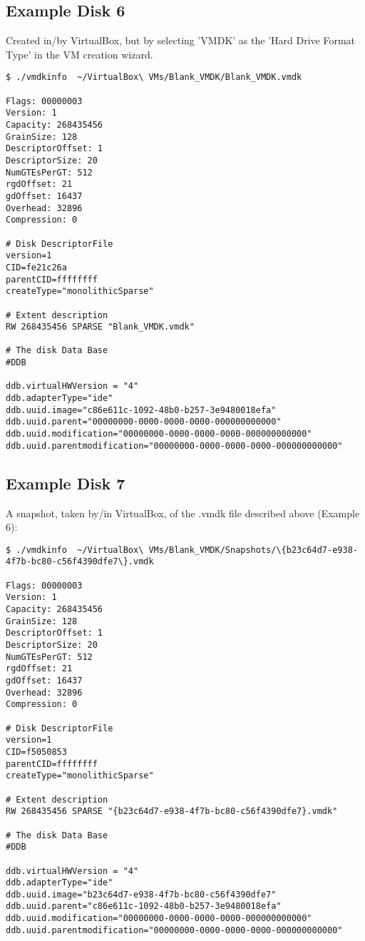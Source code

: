 \documentclass{article}
\begin{document}
\subsection{Example Disk 6}

Created in/by VirtualBox, but by selecting 'VMDK' as the 'Hard Drive
Format Type' in the VM creation wizard.

\begin{verbatim}
$ ./vmdkinfo  ~/VirtualBox\ VMs/Blank_VMDK/Blank_VMDK.vmdk 

Flags: 00000003
Version: 1
Capacity: 268435456
GrainSize: 128
DescriptorOffset: 1
DescriptorSize: 20
NumGTEsPerGT: 512
rgdOffset: 21
gdOffset: 16437
Overhead: 32896
Compression: 0

# Disk DescriptorFile
version=1
CID=fe21c26a
parentCID=ffffffff
createType="monolithicSparse"

# Extent description
RW 268435456 SPARSE "Blank_VMDK.vmdk"

# The disk Data Base 
#DDB

ddb.virtualHWVersion = "4"
ddb.adapterType="ide"
ddb.uuid.image="c86e611c-1092-48b0-b257-3e9480018efa"
ddb.uuid.parent="00000000-0000-0000-0000-000000000000"
ddb.uuid.modification="00000000-0000-0000-0000-000000000000"
ddb.uuid.parentmodification="00000000-0000-0000-0000-000000000000"
\end{verbatim}

\subsection{Example Disk 7}

A snapshot, taken by/in VirtualBox, of the .vmdk file described above
(Example 6):

\begin{verbatim}
$ ./vmdkinfo  ~/VirtualBox\ VMs/Blank_VMDK/Snapshots/\{b23c64d7-e938-4f7b-bc80-c56f4390dfe7\}.vmdk 

Flags: 00000003
Version: 1
Capacity: 268435456
GrainSize: 128
DescriptorOffset: 1
DescriptorSize: 20
NumGTEsPerGT: 512
rgdOffset: 21
gdOffset: 16437
Overhead: 32896
Compression: 0

# Disk DescriptorFile
version=1
CID=f5050853
parentCID=ffffffff
createType="monolithicSparse"

# Extent description
RW 268435456 SPARSE "{b23c64d7-e938-4f7b-bc80-c56f4390dfe7}.vmdk"

# The disk Data Base 
#DDB

ddb.virtualHWVersion = "4"
ddb.adapterType="ide"
ddb.uuid.image="b23c64d7-e938-4f7b-bc80-c56f4390dfe7"
ddb.uuid.parent="c86e611c-1092-48b0-b257-3e9480018efa"
ddb.uuid.modification="00000000-0000-0000-0000-000000000000"
ddb.uuid.parentmodification="00000000-0000-0000-0000-000000000000"
\end{verbatim}
\end{document}
